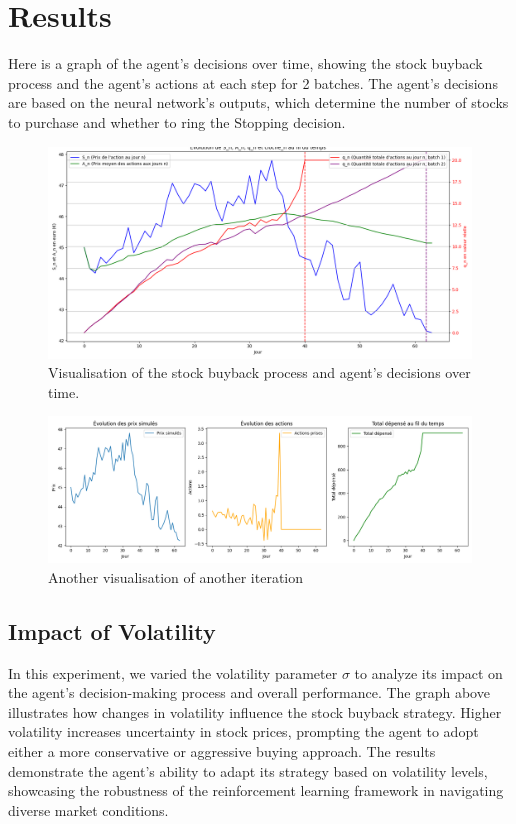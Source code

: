 \documentclass[a4paper, 12pt]{article}
\begin{document}
\section{Results}
Here is a graph of the agent's decisions over time, showing the stock buyback process and the agent's actions at each step for 2 batches. The agent's decisions are based on the neural network's outputs, which determine the number of stocks to purchase and whether to ring the Stopping decision.
\begin{figure}
    \centering
    \includegraphics[width=1\textwidth]{Net evaluation.png}
    \caption{Visualisation of the stock buyback process and agent's decisions over time.}
\end{figure}
\begin{figure}
    \centering
    \includegraphics[width=1\textwidth]{Net evaluation autre graphes.png}
    \caption{Another visualisation of another iteration}
\end{figure}

\subsection{Impact of Volatility}
In this experiment, we varied the volatility parameter $\sigma$ to analyze its impact on the agent's decision-making process and overall performance. The graph above illustrates how changes in volatility influence the stock buyback strategy. Higher volatility increases uncertainty in stock prices, prompting the agent to adopt either a more conservative or aggressive buying approach. The results demonstrate the agent's ability to adapt its strategy based on volatility levels, showcasing the robustness of the reinforcement learning framework in navigating diverse market conditions.
\end{document}
